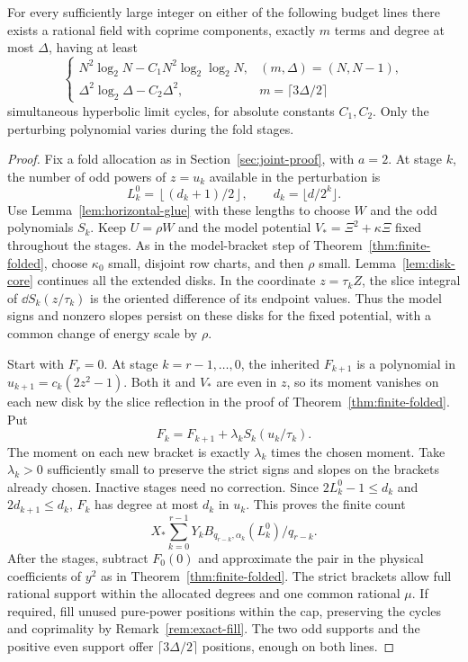 \begin{proposition}\label{prop:fixed-potential}
For every sufficiently large integer on either of the following budget lines there exists a rational field with coprime components, exactly \(m\) terms and degree at most \(\Delta\), having at least
\[
\begin{cases}
 N^2\log_2 N-C_1 N^2\log_2\log_2N, & (m,\Delta)=(N,N-1),\\
 \Delta^2\log_2\Delta-C_2\Delta^2, & m=\lceil3\Delta/2\rceil
\end{cases}
\]
simultaneous hyperbolic limit cycles, for absolute constants \(C_1,C_2\). Only the perturbing polynomial varies during the fold stages.
\end{proposition}
\begin{proof}
Fix a fold allocation as in Section~\ref{sec:joint-proof}, with \(a=2\). At stage \(k\), the number of odd powers of \(z=u_k\) available in the perturbation is
\[
 L^0_k=\left\lfloor (d_k+1)/2\right\rfloor,\qquad d_k=\lfloor d/2^k\rfloor .
\]
Use Lemma~\ref{lem:horizontal-glue} with these lengths to choose \(W\) and the odd polynomials \(S_k\). Keep \(U=\rho W\) and the model potential \(V_*=\Xi^2+\kappa\Xi\) fixed throughout the stages. As in the model-bracket step of Theorem~\ref{thm:finite-folded}, choose \(\kappa_0\) small, disjoint row charts, and then \(\rho\) small. Lemma~\ref{lem:disk-core} continues all the extended disks. In the coordinate \(z=\tau_k Z\), the slice integral of \(\dd S_k(z/\tau_k)\) is the oriented difference of its endpoint values. Thus the model signs and nonzero slopes persist on these disks for the fixed potential, with a common change of energy scale by \(\rho\).

Start with \(F_r=0\). At stage \(k=r-1,\ldots,0\), the inherited \(F_{k+1}\) is a polynomial in \(u_{k+1}=c_k(2z^2-1)\). Both it and \(V_*\) are even in \(z\), so its moment vanishes on each new disk by the slice reflection in the proof of Theorem~\ref{thm:finite-folded}. Put
\[
 F_k=F_{k+1}+\lambda_k S_k(u_k/\tau_k).
\]
The moment on each new bracket is exactly \(\lambda_k\) times the chosen moment. Take \(\lambda_k>0\) sufficiently small to preserve the strict signs and slopes on the brackets already chosen. Inactive stages need no correction. Since \(2L^0_k-1\le d_k\) and \(2d_{k+1}\le d_k\), \(F_k\) has degree at most \(d_k\) in \(u_k\). This proves the finite count
\[
 X_*\sum_{k=0}^{r-1}Y_k B_{q_{r-k},\alpha_k}(L^0_k)/q_{r-k}.
\]
After the stages, subtract \(F_0(0)\) and approximate the pair in the physical coefficients of \(y^2\) as in Theorem~\ref{thm:finite-folded}. The strict brackets allow full rational support within the allocated degrees and one common rational \(\mu\). If required, fill unused pure-power positions within the cap, preserving the cycles and coprimality by Remark~\ref{rem:exact-fill}. The two odd supports and the positive even support offer \(\lceil3\Delta/2\rceil\) positions, enough on both lines.


\end{proof}
